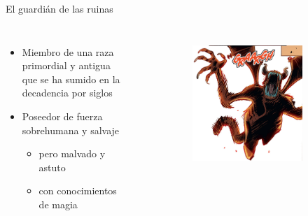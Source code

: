 \begin{frame}{El guardián de las ruinas}
	\begin{columns}
		\begin{itemize}
			\item Miembro de una raza primordial y antigua que se ha sumido en la decadencia por siglos
			\item Poseedor de fuerza sobrehumana y salvaje
			\begin{itemize}
			   \item pero malvado y astuto
			   \item con conocimientos de magia
		    \end{itemize}
		\end{itemize}
		\begin{figure}[htp]
			\centering
			\begin{subfigure}[b]{0.3\textwidth}
				\includegraphics[width=\textwidth]{img/guardian/Ablaze}
			\end{subfigure}
			~
			\begin{subfigure}[b]{0.27\textwidth}

\end{subfigure}
\end{figure}
\end{columns}
\end{frame}
